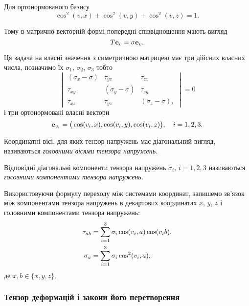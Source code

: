 Для ортонормованого базису
\begin{equation}
	\cos^2(v, x) + \cos^2(v, y) + \cos^2(v, z) = 1.
\end{equation}

Тому в матрично-векторній формі попередні співвідношення мають вигляд
\begin{equation}
	T \bf{e}_v = \sigma \bf{e}_v.	
\end{equation}

Ця задача на власні значення з симетричною матрицею має три дійсних власних числа, позначимо їх $\sigma_1$, $\sigma_2$, $\sigma_3$ тобто 
\begin{equation}
	\begin{vmatrix}
		(\sigma_x - \sigma) & \tau_{y x} & \tau_{z x} \\
		\tau_{x y} & (\sigma_y - \sigma) & \tau_{z y} \\
		\tau_{x z} & \tau_{y z} & (\sigma_z - \sigma),
	\end{vmatrix} = 0
\end{equation}
і три ортонормовані власні вектори
\begin{equation}
	\bf{e}_{v_i} = \big( \cos(v_i, x), \cos(v_i, y), \cos(v_i, z) \big), \quad i = 1, 2, 3.
\end{equation}

\begin{definition}
	Координатні вісі, для яких тензор напружень має діагональний вигляд, називаються \it{головними вісями тензора напружень}.
\end{definition}

\begin{definition}
	Відповідні діагональні компоненти тензора напружень $\sigma_i$, $i = 1,2,3$ називаються \it{головними компонентами тензора напружень}. 
\end{definition}

Використовуючи формулу переходу між системами координат, запишемо зв'язок між компонентами тензора напружень в декартових координатах $x$, $y$, $z$ і головними компонентами тензора напружень:
\begin{align}
	\tau_{a b} &= \Sum_{i = 1}^3 \sigma_i \cos(v_i, a) \cos (v_i b), \\
	\sigma_a &= \Sum_{i = 1}^3 \sigma_i \cos^2(v_i, a),
\end{align}
де $x, b \in \{x, y, z\}$.

\subsubsection{Тензор деформацій і закони його перетворення}

